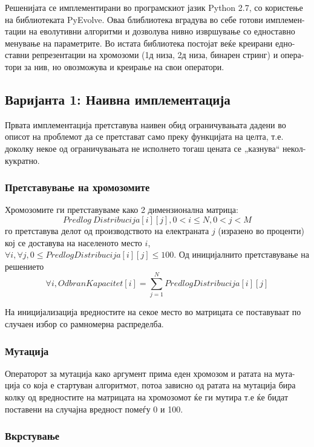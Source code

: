\documentclass{article}
\begin{document}
Решенијата се имплементирани во програмскиот јазик Python 2.7, со користење на библиотеката PyEvolve. Оваа блиблиотека вградува во себе готови имплемен-тации на еволутивни алгоритми и дозволува нивно извршување со едноставно менување на параметрите. Во истата библиотека постојат веќе креирани едно-ставни репрезентации на хромозоми (1д низа, 2д низа, бинарен стринг) и опера-тори за нив, но овозможува и креирање на свои оператори.

\subsection{Варијанта 1: Наивна имплементација}

Првата имплементација претставува наивен обид ограничувањата дадени во описот на проблемот да се претстават само преку функцијата на целта, т.е. доколку некое од ограничувањата не исполнето тогаш цената се „казнува“ некол-кукратно. 

\subsubsection{Претставување на хромозомите}

Хромозомите ги претставуваме како 2 димензионална матрица: 
\[Predlog\ Distribucija[i][j], 0 < i \leq N, 0 < j < M \]
 го претставува делот од производството на електраната $j$ (изразено во проценти) кој се доставува на населеното место $i$, $ \forall i, \forall j, 0 \leq PredlogDistribucija[i][j] \leq 100$. Од иницијалнито претставување на решението 
\[ \forall i, OdbranKapacitet[i] = \sum_{j=1}^{N} PredlogDistribucija[i][j]\]

На иницијализација вредностите на секое место во матрицата се поставуваат по случаен избор со рамномерна распределба.

\subsubsection{Мутација}

Операторот за мутација како аргумент прима еден хромозом и ратата на мута-ција со која е стартуван алгоритмот, потоа зависно од ратата на мутација бира колку од вредностите на матрицата на хромозомот ќе ги мутира т.е ќе бидат поставени на случајна вредност помеѓу 0 и 100.
 
\subsubsection{Вкрстување}
\end{document}
